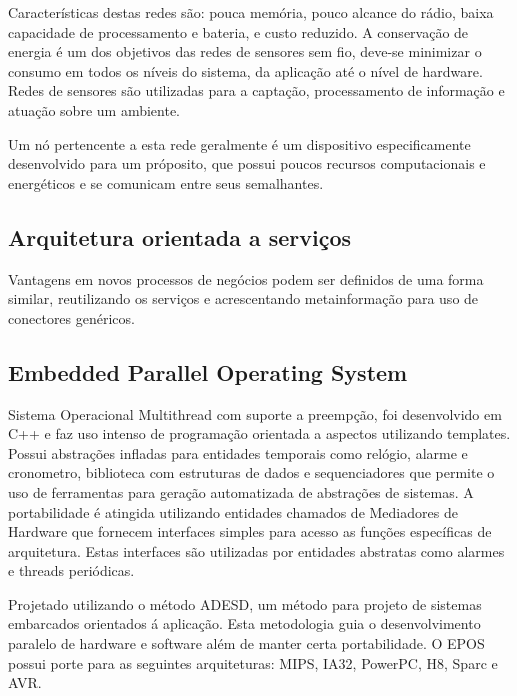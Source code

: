 Caracter\'isticas destas redes s\~ao: pouca mem\'oria, pouco alcance do r\'adio, baixa capacidade de processamento e bateria, e custo reduzido. A conserva\c{c}\~ao de energia \'e um dos objetivos das redes de sensores sem fio, deve-se minimizar o consumo em todos os n\'iveis do sistema, da aplica\c{c}\~ao at\'e o n\'ivel de hardware. Redes de sensores s\~ao utilizadas para a capta\c{c}\~ao, processamento de informa\c{c}\~ao e atua\c{c}\~ao sobre um ambiente.

Um n\'o pertencente a esta rede geralmente \'e um dispositivo especificamente desenvolvido para um pr\'oposito, que possui poucos recursos computacionais e energ\'eticos e se comunicam entre seus semalhantes.

\subsection{Arquitetura orientada a servi\c{c}os}
Vantagens em novos processos de neg\'ocios podem ser definidos de uma forma similar, reutilizando os servi\c{c}os e acrescentando metainforma\c{c}\~ao para uso de conectores gen\'ericos.
\cite{perrey2003service}

\subsection{Embedded Parallel Operating System}
Sistema Operacional Multithread com suporte a preemp\c{c}\~ao, foi desenvolvido em C++ e faz uso intenso de programa\c{c}\~ao orientada a aspectos utilizando templates.
Possui abstra\c{c}\~oes infladas para entidades temporais como rel\'ogio, alarme e cronometro, biblioteca com estruturas de dados e sequenciadores que permite o uso de ferramentas para gera\c{c}\~ao automatizada de abstra\c{c}\~oes de sistemas. A portabilidade \'e atingida utilizando entidades chamados de Mediadores de Hardware que fornecem interfaces simples para acesso as fun\c{c}\~oes espec\'ificas de arquitetura. Estas interfaces s\~ao utilizadas por entidades abstratas como alarmes e threads peri\'odicas.

Projetado utilizando o m\'etodo ADESD, um m\'etodo para projeto de sistemas embarcados orientados \'a aplica\c{c}\~ao. Esta metodologia guia o desenvolvimento paralelo de hardware e software al\'em de manter certa portabilidade. O EPOS possui porte para as seguintes arquiteturas: MIPS, IA32, PowerPC, H8, Sparc e AVR.

\cite{epos}


